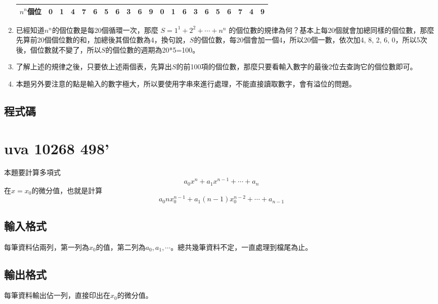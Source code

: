 \begin{enumerate}
\begin{table}[h]
\begin{tabular}{|c|c|c|c|c|c|c|c|c|c|c|c|c|c|c|c|c|c|c|c|c|}
		\hline 
		$n^n$個位 & 0 & 1 & 4 & 7 & 6 & 5 & 6 & 3 & 6 & 9 & 0 & 1 & 6 & 3 & 6 & 5 & 6 & 7 & 4 & 9\\ 
		\hline 
	\end{tabular} 
	\end{table}
	\item 已經知道$n^n$的個位數是每20個循環一次，那麼
	$S=1^1+2^2+\cdots+n^n$ 的個位數的規律為何？基本上每20個就會加總同樣的個位數，那麼先算前20個個位數的和，加總後其個位數為4，換句說，$S$的個位數，每20個會加一個4，所以20個一數，依次加4, 8, 2, 6, 0，所以5次後，個位數就不變了，所以$S$的個位數的週期為20*5=100。
	\item 了解上述的規律之後，只要依上述兩個表，先算出$S$的前100項的個位數，那麼只要看輸入數字的最後2位去查詢它的個位數即可。
	\item 本題另外要注意的點是輸入的數字極大，所以要使用字串來進行處理，不能直接讀取數字，會有溢位的問題。
\end{enumerate}

\subsection{程式碼}

\section{uva 10268 498'}
本題要計算多項式
$$a_0x^n + a_1x^{n-1} + \cdots + a_n$$
在$x=x_0$的微分值，也就是計算
$$a_0nx_0^{n-1}+a_1(n-1)x_0^{n-2}+\cdots+a_{n-1}$$

\subsection{輸入格式}
每筆資料佔兩列，第一列為$x_0$的值，第二列為$a_0, a_1, \cdots$。總共幾筆資料不定，一直處理到檔尾為止。
\subsection{輸出格式}
每筆資料輸出佔一列，直接印出在$x_0$的微分值。

